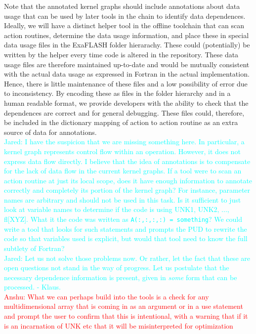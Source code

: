 \documentclass{article}
\newcommand{\code}[1]{{\tt#1}}
\newcommand{\FlashOfTheFuture}{ExaFLASH\xspace}
\newcommand{\Anshu}[1]          {\textcolor{red}{Anshu: #1}}
\newcommand{\Jared}[1]          {\textcolor{cyan}{Jared: #1}}
\newcommand{\JaredRfromKW}[1]   {\textcolor{cyan}{Jared: #1 - Klaus.}}
\newcommand{\shortPUD}   {PUD\xspace}
\newcommand{\PUD}    {\shortPUD}
\begin{document}
Note that the annotated kernel graphs should include annotations about data
usage that can be used by later tools in the chain to identify data
dependences.  Ideally, we will have a distinct helper tool in the offline
toolchain that can scan action routines, determine the data usage information,
and place these in special data usage files in the \FlashOfTheFuture folder
hierarachy.  These could (potentially) be written by the helper every time code
is altered in the repository.  These data usage files are therefore maintained
up-to-date and would be mutually consistent with the actual data usage as
expressed in Fortran in the actual implementation.  Hence, there is little
maintenance of these files and a low possibility of error due to inconsistency.
By encoding these as files in the folder hierarchy and in a human readable
format, we provide developers with the ability to check that the dependences
are correct and for general debugging.  These files could, therefore, be included in the
dictionary mapping of action to action routine as an extra source of data
for annotations.\\

\Jared{I have the suspicion that we are missing something here.  In particular,
a kernel graph represents control flow within an operation.  However, it does
not express data flow directly.  I believe that the idea of annotations is to
compensate for the lack of data flow in the current kernel graphs.  If a
tool were to scan an action routine at just its local scope, does it have enough
information to annotate correctly and completely its portion of the kernel
graph?  For instance, parameter names are arbitrary and should not be used in
this task.  Is it sufficient to just look at variable names to determine if the
code is using UNK1, UNK2, ..., fl[XYZ].  What it the code was written as
\code{A(:,:,:,:) = something}?  We could write a tool that looks for such
statements and prompts the \PUD to rewrite the code so that variables used is
explicit, but would that tool need to know the full subtlety of Fortran?}\\
\JaredRfromKW{Let us not solve those problems now. Or rather, let the fact
that these are open questions not stand in the way of progress.
Let us postulate that the necessary dependence information is present,
given in \emph{some} form that can be processed.
}\\

\Anshu{What we can perhaps build into the tools is a check for any
  multidimensional array that is coming in as an argument or in a use
  statement and prompt the user to confirm that this is intentional,
  with a warning that if it is an incarnation of UNK etc that it will
  be misinterpreted for optimization}\\
\end{document}
